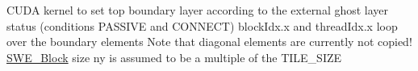 C\-U\-D\-A kernel to set top boundary layer according to the external ghost layer status (conditions P\-A\-S\-S\-I\-V\-E and C\-O\-N\-N\-E\-C\-T) block\-Idx.\-x and thread\-Idx.\-x loop over the boundary elements Note that diagonal elements are currently not copied! \hyperlink{classSWE__Block}{S\-W\-E\-\_\-\-Block} size ny is assumed to be a multiple of the T\-I\-L\-E\-\_\-\-S\-I\-Z\-E 
